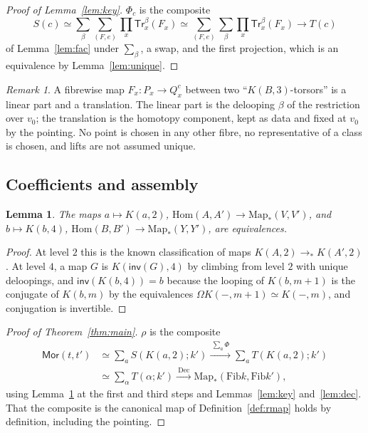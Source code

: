 \documentclass[11pt]{amsart}
\newtheorem{lemma}[theorem]{Lemma}
\theoremstyle{definition}
\theoremstyle{remark}
\newtheorem{remark}[theorem]{Remark}
\newcommand{\Om}{\Omega}
\newcommand{\Fib}{\mathrm{Fib}}
\newcommand{\Mor}{\mathsf{Mor}}
\newcommand{\Hom}{\mathrm{Hom}}
\newcommand{\Map}{\mathrm{Map}_*}
\newcommand{\rmap}{\rho}
\newcommand{\Tl}{\mathsf{Tr}}
\newcommand{\cmp}{\mathbin{;}}
\begin{document}
\begin{proof}[Proof of Lemma~\ref{lem:key}]
$\Phi_c$ is the composite
\[S(c)\simeq\sum_\beta\sum_{(F,e)}\prod_x\Tl^\beta_x(F_x)
\simeq\sum_{(F,e)}\sum_\beta\prod_x\Tl^\beta_x(F_x)\longrightarrow T(c)\]
of Lemma~\ref{lem:fac} under $\sum_\beta$, a swap, and the first projection,
which is an equivalence by Lemma~\ref{lem:unique}.
\end{proof}

\begin{remark}
A fibrewise map $F_x:P_x\to Q^c_x$ between two ``$K(B,3)$-torsors'' is a linear
part and a translation. The linear part is the delooping $\beta$ of the
restriction over $v_0$; the translation is the homotopy component, kept as
data and fixed at $v_0$ by the pointing. No point is chosen in any other fibre,
no representative of a class is chosen, and lifts are not assumed unique.
\end{remark}

\subsection{Coefficients and assembly}

\begin{lemma}\label{lem:coef}
The maps $a\mapsto K(a,2)$, $\Hom(A,A')\to\Map(V,V')$, and $b\mapsto K(b,4)$,
$\Hom(B,B')\to\Map(Y,Y')$, are equivalences.
\end{lemma}
\begin{proof}
At level $2$ this is the known classification of maps $K(A,2)\to_*K(A',2)$. At
level $4$, a map $G$ is $K(\mathsf{inv}(G),4)$ by climbing from level $2$ with
unique deloopings, and $\mathsf{inv}(K(b,4))=b$ because the looping of
$K(b,m+1)$ is the conjugate of $K(b,m)$ by the equivalences
$\Om K(-,m+1)\simeq K(-,m)$, and conjugation is invertible.
\end{proof}

\begin{proof}[Proof of Theorem~\ref{thm:main}]
$\rmap$ is the composite
\begin{align*}
\Mor(t,t')&\simeq\textstyle\sum_aS(K(a,2)\cmp k')
\xrightarrow{\ \sum_a\Phi\ }\textstyle\sum_aT(K(a,2)\cmp k')\\
&\simeq\textstyle\sum_{\alpha}T(\alpha\cmp k')
\xrightarrow{\ \mathrm{Dec}\ }\Map(\Fib k,\Fib k'),
\end{align*}
using Lemma~\ref{lem:coef} at the first and third steps and
Lemmas~\ref{lem:key} and~\ref{lem:dec}. That the composite is the canonical
map of Definition~\ref{def:rmap} holds by definition, including the pointing.
\end{proof}
\end{document}
